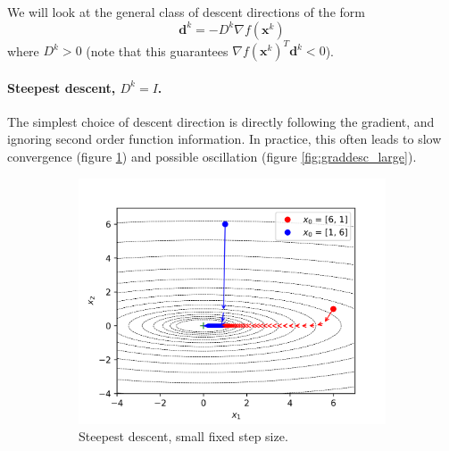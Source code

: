 We will look at the general class of descent directions of the form 
\begin{equation}
    \bm{d}^k = -D^k \nabla f(\bm{x}^k)
\end{equation}
where $D^k > 0$ (note that this guarantees $\nabla f(\bm{x}^k)^T \bm{d}^k < 0$). 

\paragraph{Steepest descent, $D^k = I$.} The simplest choice of descent direction is directly following the gradient, and ignoring second order function information. In practice, this often leads to slow convergence (figure \ref{fig:graddesc_small}) and possible oscillation (figure \ref{fig:graddesc_large}).

\begin{figure}[!t]
    \centering
    \begin{subfigure}[b]{0.46\linewidth}
        \centering
        \includegraphics[width=\textwidth]{figs/small_step.png}
        \caption{Steepest descent, small fixed step size.}
        \label{fig:graddesc_small}
    \end{subfigure}%
    \begin{subfigure}[b]{0.46\linewidth}
        \centering

\end{subfigure}
\end{figure}
